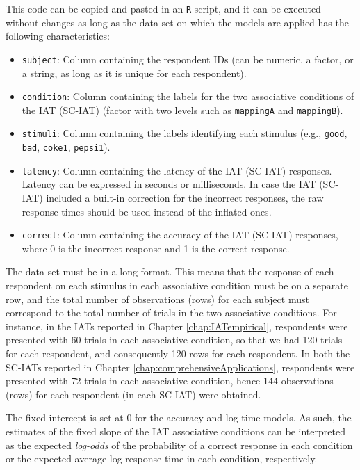 \documentclass[12pt]{book}
\begin{document}
This code can be copied and pasted in an \texttt{R} script, and it can be executed without changes as long as the data set on which the models are applied has the following characteristics: 

\begin{itemize}
	\item \texttt{subject}: Column containing the respondent IDs (can be numeric, a factor, or a string, as long as it is unique for each respondent).
	\item\texttt{condition}: Column containing the labels for the two associative conditions of the IAT (SC-IAT) (factor with two levels such as \texttt{mappingA} and \texttt{mappingB}).
	\item \texttt{stimuli}: Column containing the labels identifying each stimulus (e.g., \texttt{good}, \texttt{bad}, \texttt{coke1}, \texttt{pepsi1}).
	\item \texttt{latency}: Column containing the latency of the IAT (SC-IAT) responses. Latency can be expressed in seconds or milliseconds. In case the IAT (SC-IAT) included a built-in correction for the incorrect responses, the raw response times should be used instead of the inflated ones.
	\item \texttt{correct}: Column containing the accuracy of the IAT (SC-IAT) responses, where 0 is the incorrect response and 1 is the correct response.
\end{itemize}

The data set must be in a long format. This means that the response of each respondent on each stimulus in each associative condition must be on a separate row, and the total number of observations (rows) for each subject must correspond to the total number of trials in the two associative conditions. 
For instance, in the IATs reported in Chapter \ref{chap:IATempirical}, respondents were presented with 60 trials in each associative condition, so that we had 120 trials for each respondent, and consequently 120 rows for each respondent. 
In both the SC-IATs reported in Chapter \ref{chap:comprehensiveApplications}, respondents were presented with 72 trials in each associative condition, hence 144 observations (rows) for each respondent (in each SC-IAT) were obtained.

The fixed intercept is set at 0 for the accuracy and log-time models. As such, the estimates of the fixed slope of the IAT associative conditions can be interpreted as the expected \emph{log-odds} of the probability of a correct response in each condition or the expected average log-response time in each condition, respectively.
\end{document}
